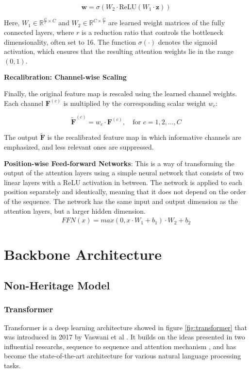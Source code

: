 \[
\mathbf{w} = \sigma \left( W_2 \cdot \text{ReLU}(W_1 \cdot \mathbf{z}) \right)
\]

Here, \( W_1 \in \mathbb{R}^{\frac{C}{r} \times C} \) and \( W_2 \in \mathbb{R}^{C \times \frac{C}{r}} \) are learned weight matrices of the fully connected layers, where \( r \) is a reduction ratio that controls the bottleneck dimensionality, often set to 16. The function \( \sigma(\cdot) \) denotes the sigmoid activation, which ensures that the resulting attention weights lie in the range \( (0, 1) \).

\textbf{Recalibration: Channel-wise Scaling}

Finally, the original feature map is rescaled using the learned channel weights. Each channel \( \mathbf{F}^{(c)} \) is multiplied by the corresponding scalar weight \( w_c \):

\[
\tilde{\mathbf{F}}^{(c)} = w_c \cdot \mathbf{F}^{(c)}, \quad \text{for } c = 1, 2, \dots, C
\]

The output \( \tilde{\mathbf{F}} \) is the recalibrated feature map in which informative channels are emphasized, and less relevant ones are suppressed.


\textbf{Position-wise Feed-forward Networks}: This is a way of transforming the output of the attention layers using a simple neural network that consists of two linear layers with a ReLU activation in between. The network is applied to each position separately and identically, meaning that it does not depend on the order of the sequence. The network has the same input and output dimension as the attention layers, but a larger hidden dimension.
\begin{align}
    FFN(x)=max(0,x\cdot W_1+b_1)\cdot W_2+b_2
\end{align}

\section{Backbone Architecture}

\subsection{Non-Heritage Model}

\subsubsection{Transformer}
Transformer is a deep learning architecture showed in figure \ref{fig:transformer} that was introduced in 2017 by Vaswani et al \cite{NIPS2017_3f5ee243}. It builds on the ideas presented in two influential researchs, sequence to sequence \cite{NIPS2014_a14ac55a, DBLP:journals/corr/WuSCLNMKCGMKSJL16} and attention mechanism \cite{luong-etal-2015-effective}, and has become the state-of-the-art architecture for various natural language processing tasks.

